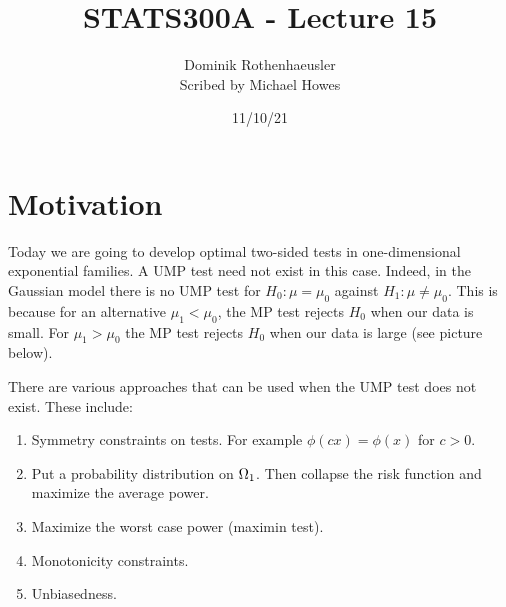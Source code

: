 




\title{STATS300A - Lecture 15}
\author{Dominik Rothenhaeusler\\ Scribed by Michael Howes}
\date{11/10/21}

\pagestyle{fancy}
\fancyhf{}


\maketitle
\tableofcontents
\section{Motivation}
Today we are going to develop optimal two-sided tests in one-dimensional exponential families. A UMP test need not exist in this case. Indeed, in the Gaussian model there is no UMP test for $H_0 : \mu =\mu_0$ against $H_1 : \mu \neq \mu_0$. This is because for an alternative $\mu_1 < \mu_0$, the MP test rejects $H_0$ when our data is small. For $\mu_1 >\mu_0$ the MP test rejects $H_0$ when our data is large (see picture below).
\begin{center}
    
\end{center}


There are various approaches that can be used when the UMP test does not exist. These include:
\begin{enumerate}
    \item Symmetry constraints on tests. For example $\phi (c x) = \phi(x)$ for $c >0$.
    \item Put a probability distribution on ${{\Omega}}_1$. Then collapse the risk function and maximize the average power.
    \item Maximize the worst case power (maximin test).
    \item Monotonicity constraints.
    \item Unbiasedness.
\end{enumerate}
